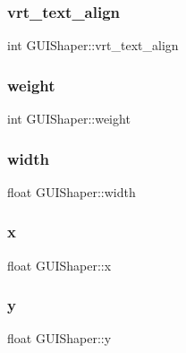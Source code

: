 \hypertarget{class_g_u_i_shaper_a85ca52a0dbb0e3e7866e676e41176715}{}\label{class_g_u_i_shaper_a85ca52a0dbb0e3e7866e676e41176715} 
\subsubsection{\texorpdfstring{vrt\+\_\+text\+\_\+align}{vrt\_text\_align}}
{\footnotesize\ttfamily int G\+U\+I\+Shaper\+::vrt\+\_\+text\+\_\+align}

\hypertarget{class_g_u_i_shaper_ab3a41684cd6fbaaf6e11f83b2dd3acf6}{}\label{class_g_u_i_shaper_ab3a41684cd6fbaaf6e11f83b2dd3acf6} 
\subsubsection{\texorpdfstring{weight}{weight}}
{\footnotesize\ttfamily int G\+U\+I\+Shaper\+::weight}

\hypertarget{class_g_u_i_shaper_a014783d6e1614879eb7805784b142ff6}{}\label{class_g_u_i_shaper_a014783d6e1614879eb7805784b142ff6} 
\subsubsection{\texorpdfstring{width}{width}}
{\footnotesize\ttfamily float G\+U\+I\+Shaper\+::width}

\hypertarget{class_g_u_i_shaper_ae2c65722ddfef5f039aead1b972438a9}{}\label{class_g_u_i_shaper_ae2c65722ddfef5f039aead1b972438a9} 
\subsubsection{\texorpdfstring{x}{x}}
{\footnotesize\ttfamily float G\+U\+I\+Shaper\+::x}

\hypertarget{class_g_u_i_shaper_aa3e7a3dd639b50ea13cf20e921135dd6}{}\label{class_g_u_i_shaper_aa3e7a3dd639b50ea13cf20e921135dd6} 
\subsubsection{\texorpdfstring{y}{y}}
{\footnotesize\ttfamily float G\+U\+I\+Shaper\+::y}

